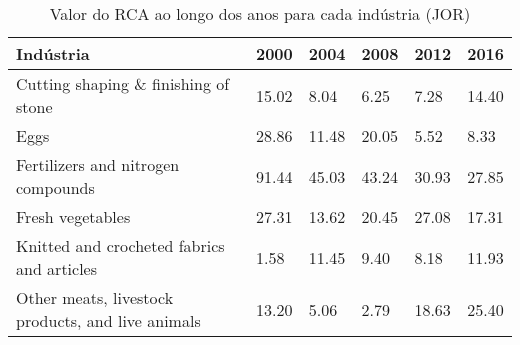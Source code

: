 \begin{table}
\centering
\caption{Valor do RCA ao longo dos anos para cada indústria (JOR)}
\begin{tabular}{p{6cm}p{1.5cm}p{1.5cm}p{1.5cm}p{1.5cm}p{1.5cm}}
\toprule
                                        Indústria &  2000 &  2004 &  2008 &  2012 &  2016 \\
\midrule
             Cutting shaping \& finishing of stone & 15.02 &  8.04 &  6.25 &  7.28 & 14.40 \\
                                             Eggs & 28.86 & 11.48 & 20.05 &  5.52 &  8.33 \\
               Fertilizers and nitrogen compounds & 91.44 & 45.03 & 43.24 & 30.93 & 27.85 \\
                                 Fresh vegetables & 27.31 & 13.62 & 20.45 & 27.08 & 17.31 \\
       Knitted and crocheted fabrics and articles &  1.58 & 11.45 &  9.40 &  8.18 & 11.93 \\
Other meats, livestock products, and live animals & 13.20 &  5.06 &  2.79 & 18.63 & 25.40 \\
\bottomrule
\end{tabular}
\end{table}
